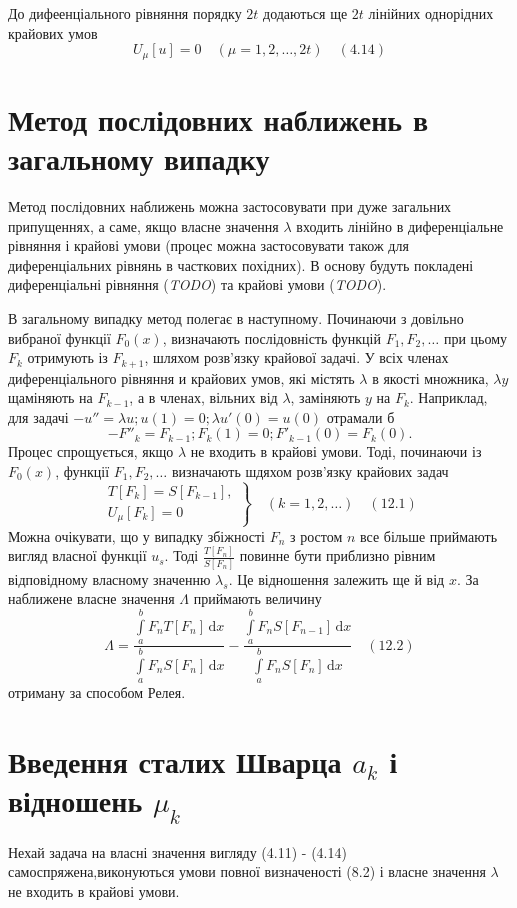 \documentclass[12pt,a4paper]{article}
\begin{document}
До дифеенціального рівняння порядку $2t$ додаються ще $2t$ лінійних однорідних крайових умов
\[
U_\mu [u] = 0 \quad (\mu = 1, 2, \dots, 2t)   \quad (4.14)
\]

\clearpage

\section{Метод послідовних наближень в загальному випадку}Метод послідовних наближень можна застосовувати при дуже загальних припущеннях, а саме, якщо власне значення $\lambda$ входить лінійно в диференціальне рівняння і крайові умови (процес можна застосовувати також для диференціальних рівнянь в часткових похідних). В основу будуть покладені диференціальні рівняння (\emph{TODO}) та крайові умови (\emph{TODO}).

В загальному випадку метод полегає в наступному. Починаючи з довільно вибраної функції $F_0(x)$, визначають послідовність функцій $F_1, F_2, \dots$ при цьому $F_k$ отримують із $F_{k+1}$, шляхом розв'язку крайової задачі. У всіх членах диференціального рівняння и крайових умов, які містять $\lambda$ в якості множника, $\lambda y$ щаміняють на $F_{k-1}$, а в членах, вільних від $\lambda$, заміняють $y$ на $F_k$. Наприклад, для задачі $- u'' = \lambda u; u(1) = 0; \lambda u'(0) = u(0)$ отрамали б
\[
	- F''_k = F_{k-1}; F_k(1) = 0; F'_{k-1}(0) = F_k(0).
\] 
Процес спрощується, якщо $\lambda$ не входить в крайові умови. Тоді, починаючи із $F_0(x)$, функції $F_1, F_2, \dots$ визначають шдяхом розв'язку крайових задач
\[
\left.
\begin{array}{l}
	T[F_k] = S[F_{k-1}],\\
	U_\mu[F_k] = 0
\end{array} \right\}
\quad
(k = 1, 2, \dots)   \quad (12.1)
\]
Можна очікувати, що у випадку збіжності $F_n$ з ростом $n$ все більше приймають вигляд власної функції $u_s$. Тоді $\frac{T[F_n]}{S[F_n]}$ повинне бути приблизно рівним відповідному власному значенню $\lambda_s$. Це відношення залежить ще й від $x$. За наближене власне значення $\Lambda$ приймають величину
\[
\Lambda = \frac{\int\limits_a^b F_n T[F_n]\,\mathrm{d}x}
			   {\int\limits_a^b F_n S[F_n]\,\mathrm{d}x}
		  -
		  \frac{\int\limits_a^b F_n S[F_{n-1}]\,\mathrm{d}x}
			   {\int\limits_a^b F_n S[F_n]\,\mathrm{d}x}
   \quad (12.2)
\]
отриману за способом Релея.

\section{Введення сталих Шварца $a_k$ і відношень $\mu_k$}
Нехай задача на власні значення вигляду (4.11) - (4.14) самоспряжена,виконуються умови повної визначеності (8.2) і власне значення $\lambda$ не входить в крайові умови.
\end{document}
